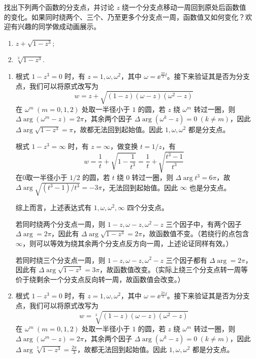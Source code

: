 
\begin{question}
找出下列两个函数的分支点，并讨论 \(z\) 绕一个分支点移动一周回到原处后函数值的变化。如果同时绕两个、三个、乃至更多个分支点一周，函数值又如何变化？欢迎有兴趣的同学做成动画展示。

\begin{enumerate}
  \item \(z + \sqrt{1 - z^3}\);
  \item \(\sqrt[3]{1 - z^3}\).
\end{enumerate}
\begin{solution}
\begin{enumerate}
  \item 根式 \(1-z^3=0\) 时，有 \(z=1,\omega , \omega^2\)，其中 \(\omega=\ee^{\frac{2\pi}{3} \ii}\)。接下来验证其是否为分支点，我们可以将原式改写为 \[
w=z+\sqrt{(1-z)(\omega-z)(\omega^2-z)}
\] 在 \(\omega^m \;(m=0,1,2)\) 处取一半径小于 \(1\) 的圆，若 \(z\) 绕 \(\omega^m\) 转过一圈，则 \(\Delta \arg(\omega^m - z) = 2\pi\)，其余两个因子 \(\Delta \arg (\omega^k-z) =0\;(k \neq m)\)，因此 \(\Delta \arg \sqrt{1-z^3}=\pi\)，故都无法回到起始值。因此 \(1,\omega,\omega^2\) 都是分支点。

根式 \(1-z^3=\infty\) 时，有 \(z=\infty\)，做变换 \(t=1/z\)，有 \[
w = \frac1t+\sqrt{1-\frac1{t^3}}=\frac1t + \sqrt{\frac{t^3-1}{t^3}}
\] 在0取一半径小于 \(1/2\) 的圆，若 \(t\) 绕 \(0\) 转过一圈，则 \(\Delta \arg t^3=6\pi\)，故 \(\Delta \arg \sqrt{(t^3-1)/t^3}=-3\pi\)，无法回到起始值。因此 \(\infty\) 也是分支点。

综上而言，上述表达式有 \(1,\omega,\omega^2,\infty\) 四个分支点。

\medskip

若同时绕两个分支点一周，则 \(1-z,\omega-z,\omega^2-z\) 三个因子中，有两个因子 \(\Delta \arg = 2\pi\)，因此有 \(\Delta \arg \sqrt{1-z^3} = 2\pi\)，故函数值不变。（若绕行的点包含 \(\infty\)，则可以等效为绕其余两个分支点反方向一周，上述论证同样有效。）

若同时绕三个分支点一周，则 \(1-z,\omega-z,\omega^2-z\) 三个因子都有 \(\Delta \arg = 2\pi\)，因此有 \(\Delta \arg \sqrt{1-z^3} = 3\pi\)，故函数值改变。（实际上绕三个分支点转一周等价于绕剩余一个分支点反向转一周，故函数值会改变。）

  \item 根式 \(1-z^3=0\) 时，有 \(z=1,\omega,\omega^2\)，其中 \(\omega = \ee^{\frac{2\pi}{3} \ii}\)。接下来验证其是否为分支点，我们可以将原式改写为 \[
w=\sqrt[3]{(1-z)(\omega-z)(\omega^2-z)}
\] 在 \(\omega^m \;(m=0,1,2)\) 处取一半径小于 \(1\) 的圆，若 \(z\) 绕 \(\omega^m\) 转过一圈，则 \(\Delta \arg(\omega^m - z) = 2\pi\)，其余两个因子 \(\Delta \arg (\omega^k-z) =0\;(k \neq m)\)，因此 \(\Delta \arg \sqrt[3]{1-z^3}=\frac{2\pi}{3}\)，故都无法回到起始值。因此 \(1,\omega,\omega^2\) 都是分支点。


\end{enumerate}
\end{solution}
\end{question}
